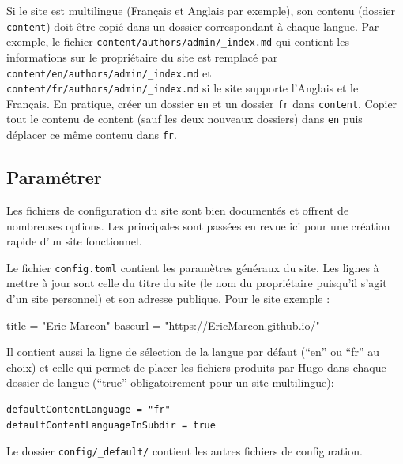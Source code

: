\documentclass[
  12pt,
  french,
  a4paper,
  extrafontsizes,onecolumn,openright
  ]{memoir}
\newenvironment{Shaded}{\begin{snugshade}}{\end{snugshade}}
\newcommand{\NormalTok}[1]{#1}
\newcommand{\StringTok}[1]{\textcolor[rgb]{0.31,0.60,0.02}{#1}}
\begin{document}
Si le site est multilingue (Français et Anglais par exemple), son contenu (dossier \texttt{content}) doit être copié dans un dossier correspondant à chaque langue.
Par exemple, le fichier \texttt{content/authors/admin/\_index.md} qui contient les informations sur le propriétaire du site est remplacé par \texttt{content/en/authors/admin/\_index.md} et \texttt{content/fr/}\break\texttt{authors/admin/\_index.md} si le site supporte l'Anglais et le Français.
En pratique, créer un dossier \texttt{en} et un dossier \texttt{fr} dans \texttt{content}.
Copier tout le contenu de content (sauf les deux nouveaux dossiers) dans \texttt{en} puis déplacer ce même contenu dans \texttt{fr}.

\hypertarget{paramuxe9trer}{%
\subsection{Paramétrer}\label{paramuxe9trer}}

Les fichiers de configuration du site sont bien documentés et offrent de nombreuses options.
Les principales sont passées en revue ici pour une création rapide d'un site fonctionnel.

Le fichier \texttt{config.toml} contient les paramètres généraux du site.
Les lignes à mettre à jour sont celle du titre du site (le nom du propriétaire puisqu'il s'agit d'un site personnel) et son adresse publique.
Pour le site exemple :

\scriptsize

\begin{Shaded}
\begin{Highlighting}[]
\NormalTok{title =}\StringTok{ "Eric Marcon"}
\NormalTok{baseurl =}\StringTok{ "https://EricMarcon.github.io/"}
\end{Highlighting}
\end{Shaded}

\normalsize

Il contient aussi la ligne de sélection de la langue par défaut (\enquote{en} ou \enquote{fr} au choix) et celle qui permet de placer les fichiers produits par Hugo dans chaque dossier de langue (\enquote{true} obligatoirement pour un site multilingue):

\begin{verbatim}
defaultContentLanguage = "fr"
defaultContentLanguageInSubdir = true
\end{verbatim}

Le dossier \texttt{config/\_default/} contient les autres fichiers de configuration.
\end{document}
